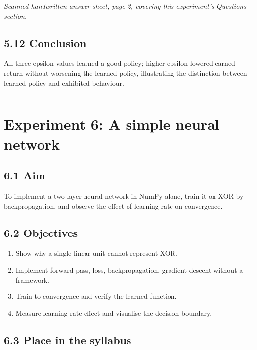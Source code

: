 \documentclass[
]{article}
\providecommand{\tightlist}{%
  \setlength{\itemsep}{0pt}\setlength{\parskip}{0pt}}
\begin{document}
\emph{Scanned handwritten answer sheet, page 2, covering this
experiment's Questions section.}

\subsection{5.12 Conclusion}\label{conclusion-4}

All three epsilon values learned a good policy; higher epsilon lowered
earned return without worsening the learned policy, illustrating the
distinction between learned policy and exhibited behaviour.

\begin{center}\rule{0.5\linewidth}{0.5pt}\end{center}

\section{Experiment 6: A simple neural
network}\label{experiment-6-a-simple-neural-network}

\subsection{6.1 Aim}\label{aim-5}

To implement a two-layer neural network in NumPy alone, train it on XOR
by backpropagation, and observe the effect of learning rate on
convergence.

\subsection{6.2 Objectives}\label{objectives-5}

\begin{enumerate}
\def\labelenumi{\arabic{enumi}.}
\tightlist
\item
  Show why a single linear unit cannot represent XOR.
\item
  Implement forward pass, loss, backpropagation, gradient descent
  without a framework.
\item
  Train to convergence and verify the learned function.
\item
  Measure learning-rate effect and visualise the decision boundary.
\end{enumerate}

\subsection{6.3 Place in the syllabus}\label{place-in-the-syllabus-5}
\end{document}
